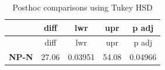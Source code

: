 \documentclass[]{article}
\begin{document}
\begin{longtable}[]{@{}ccccc@{}}
\caption{Posthoc comparisons using Tukey HSD}\tabularnewline
\toprule
\begin{minipage}[b]{0.13\columnwidth}\centering\strut
~
\strut\end{minipage} &
\begin{minipage}[b]{0.08\columnwidth}\centering\strut
diff
\strut\end{minipage} &
\begin{minipage}[b]{0.10\columnwidth}\centering\strut
lwr
\strut\end{minipage} &
\begin{minipage}[b]{0.08\columnwidth}\centering\strut
upr
\strut\end{minipage} &
\begin{minipage}[b]{0.11\columnwidth}\centering\strut
p adj
\strut\end{minipage}\tabularnewline
\midrule
\endfirsthead
\toprule
\begin{minipage}[b]{0.13\columnwidth}\centering\strut
~
\strut\end{minipage} &
\begin{minipage}[b]{0.08\columnwidth}\centering\strut
diff
\strut\end{minipage} &
\begin{minipage}[b]{0.10\columnwidth}\centering\strut
lwr
\strut\end{minipage} &
\begin{minipage}[b]{0.08\columnwidth}\centering\strut
upr
\strut\end{minipage} &
\begin{minipage}[b]{0.11\columnwidth}\centering\strut
p adj
\strut\end{minipage}\tabularnewline
\midrule
\endhead
\begin{minipage}[t]{0.13\columnwidth}\centering\strut
\textbf{NP-N}
\strut\end{minipage} &
\begin{minipage}[t]{0.08\columnwidth}\centering\strut
27.06
\strut\end{minipage} &
\begin{minipage}[t]{0.10\columnwidth}\centering\strut
0.03951
\strut\end{minipage} &
\begin{minipage}[t]{0.08\columnwidth}\centering\strut
54.08
\strut\end{minipage} &
\begin{minipage}[t]{0.11\columnwidth}\centering\strut
0.04966
\strut\end{minipage}\tabularnewline

\end{longtable}
\end{document}
